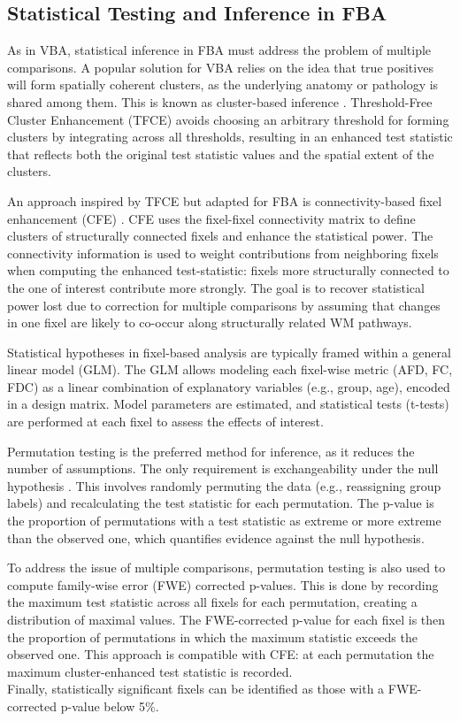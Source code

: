 \subsection{Statistical Testing and Inference in FBA}

As in VBA, statistical inference in FBA must address the problem of multiple comparisons. A popular solution for VBA relies on the idea that true positives will form spatially coherent clusters, as the underlying anatomy or pathology is shared among them. This is known as cluster-based inference \cite{Winkler2014}. Threshold-Free Cluster Enhancement (TFCE) avoids choosing an arbitrary threshold for forming clusters by integrating across all thresholds, resulting in an enhanced test statistic that reflects both the original test statistic values and the spatial extent of the clusters.

An approach inspired by TFCE but adapted for FBA is connectivity-based fixel enhancement (CFE) \cite{Raffelt2015}. CFE uses the fixel-fixel connectivity matrix to define clusters of structurally connected fixels and enhance the statistical power. The connectivity information is used to weight contributions from neighboring fixels when computing the enhanced test-statistic: fixels more structurally connected to the one of interest contribute more strongly. The goal is to recover statistical power lost due to correction for multiple comparisons by assuming that changes in one fixel are likely to co-occur along structurally related WM pathways.

Statistical hypotheses in fixel-based analysis are typically framed within a general linear model (GLM). The GLM allows modeling each fixel-wise metric (AFD, FC, FDC) as a linear combination of explanatory variables (e.g., group, age), encoded in a design matrix. Model parameters are estimated, and statistical tests (t-tests) are performed at each fixel to assess the effects of interest.

Permutation testing is the preferred method for inference, as it reduces the number of assumptions. The only requirement is exchangeability under the null hypothesis \cite{Winkler2014}. This involves randomly permuting the data (e.g., reassigning group labels) and recalculating the test statistic for each permutation. The p-value is the proportion of permutations with a test statistic as extreme or more extreme than the observed one, which quantifies evidence against the null hypothesis.

To address the issue of multiple comparisons, permutation testing is also used to compute family-wise error (FWE) corrected p-values. This is done by recording the maximum test statistic across all fixels for each permutation, creating a distribution of maximal values. The FWE-corrected p-value for each fixel is then the proportion of permutations in which the maximum statistic exceeds the observed one. This approach is compatible with CFE: at each permutation the maximum cluster-enhanced test statistic is recorded.\\
Finally, statistically significant fixels can be identified as those with a FWE-corrected p-value below 5\%.

